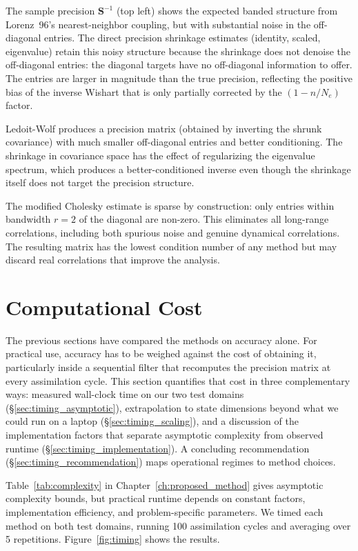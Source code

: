 The sample precision $\mathbf{S}^{-1}$ (top left) shows the expected banded structure from Lorenz~96's nearest-neighbor coupling, but with substantial noise in the off-diagonal entries. The direct precision shrinkage estimates (identity, scaled, eigenvalue) retain this noisy structure because the shrinkage does not denoise the off-diagonal entries: the diagonal targets have no off-diagonal information to offer. The entries are larger in magnitude than the true precision, reflecting the positive bias of the inverse Wishart that is only partially corrected by the $(1 - n/N_e)$ factor.

Ledoit-Wolf produces a precision matrix (obtained by inverting the shrunk covariance) with much smaller off-diagonal entries and better conditioning. The shrinkage in covariance space has the effect of regularizing the eigenvalue spectrum, which produces a better-conditioned inverse even though the shrinkage itself does not target the precision structure.

The modified Cholesky estimate is sparse by construction: only entries within bandwidth $r = 2$ of the diagonal are non-zero. This eliminates all long-range correlations, including both spurious noise and genuine dynamical correlations. The resulting matrix has the lowest condition number of any method but may discard real correlations that improve the analysis.

\section{Computational Cost}
\label{sec:timing}

The previous sections have compared the methods on accuracy alone. For practical use, accuracy has to be weighed against the cost of obtaining it, particularly inside a sequential filter that recomputes the precision matrix at every assimilation cycle. This section quantifies that cost in three complementary ways: measured wall-clock time on our two test domains (§\ref{sec:timing_asymptotic}), extrapolation to state dimensions beyond what we could run on a laptop (§\ref{sec:timing_scaling}), and a discussion of the implementation factors that separate asymptotic complexity from observed runtime (§\ref{sec:timing_implementation}). A concluding recommendation (§\ref{sec:timing_recommendation}) maps operational regimes to method choices.

Table~\ref{tab:complexity} in Chapter~\ref{ch:proposed_method} gives asymptotic complexity bounds, but practical runtime depends on constant factors, implementation efficiency, and problem-specific parameters. We timed each method on both test domains, running 100 assimilation cycles and averaging over 5 repetitions. Figure~\ref{fig:timing} shows the results.

